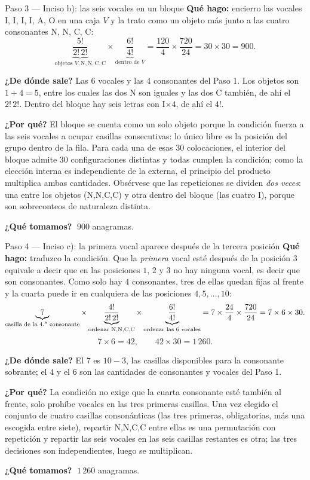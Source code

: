 \documentclass[11pt]{article}
\begin{document}
\begin{paso}{Paso 3 --- Inciso b): las seis vocales en un bloque}
\textbf{Qué hago:} encierro las vocales I, I, I, I, A, O en una caja $V$ y la trato como un objeto más
junto a las cuatro consonantes N, N, C, C:
\[
\underbrace{\frac{5!}{2!\,2!}}_{\text{objetos } V,\text{N},\text{N},\text{C},\text{C}}\times
\underbrace{\frac{6!}{4!}}_{\text{dentro de }V}
=\frac{120}{4}\times\frac{720}{24}=30\times30=900 .
\]

\textbf{¿De dónde sale?} Las $6$ vocales y las $4$ consonantes del Paso 1. Los objetos son $1+4=5$, entre
los cuales las dos N son iguales y las dos C también, de ahí el $2!\,2!$. Dentro del bloque hay seis
letras con I$\times4$, de ahí el $4!$.

\textbf{¿Por qué?} El bloque se cuenta como un solo objeto porque la condición fuerza a las seis vocales a
ocupar casillas consecutivas: lo único libre es la posición del grupo dentro de la fila. Para cada una de
esas $30$ colocaciones, el interior del bloque admite $30$ configuraciones distintas y todas cumplen la
condición; como la elección interna es independiente de la externa, el principio del producto multiplica
ambas cantidades. Obsérvese que las repeticiones se dividen \emph{dos veces}: una entre los objetos
(N,N,C,C) y otra dentro del bloque (las cuatro I), porque son sobreconteos de naturaleza distinta.

\textbf{¿Qué tomamos?} $\;900$ anagramas.
\end{paso}

\begin{paso}{Paso 4 --- Inciso c): la primera vocal aparece después de la tercera posición}
\textbf{Qué hago:} traduzco la condición. Que la \emph{primera} vocal esté después de la posición $3$
equivale a decir que en las posiciones $1$, $2$ y $3$ no hay ninguna vocal, es decir que son consonantes.
Como solo hay $4$ consonantes, tres de ellas quedan fijas al frente y la cuarta puede ir en cualquiera de
las posiciones $4,5,\dots,10$:
\[
\underbrace{7}_{\text{casilla de la 4.\textsuperscript{a} consonante}}\times
\underbrace{\frac{4!}{2!\,2!}}_{\text{ordenar N,N,C,C}}\times
\underbrace{\frac{6!}{4!}}_{\text{ordenar las 6 vocales}}
=7\times\frac{24}{4}\times\frac{720}{24}=7\times6\times30 .
\]
\[
7\times6=42,\qquad 42\times30=1\,260 .
\]

\textbf{¿De dónde sale?} El $7$ es $10-3$, las casillas disponibles para la consonante sobrante; el $4$ y
el $6$ son las cantidades de consonantes y vocales del Paso 1.

\textbf{¿Por qué?} La condición no exige que la cuarta consonante esté también al frente, solo prohíbe
vocales en las tres primeras casillas. Una vez elegido el conjunto de cuatro casillas consonánticas (las
tres primeras, obligatorias, más una escogida entre siete), repartir N,N,C,C entre ellas es una
permutación con repetición y repartir las seis vocales en las seis casillas restantes es otra; las tres
decisiones son independientes, luego se multiplican.

\textbf{¿Qué tomamos?} $\;1\,260$ anagramas.
\end{paso}
\end{document}
